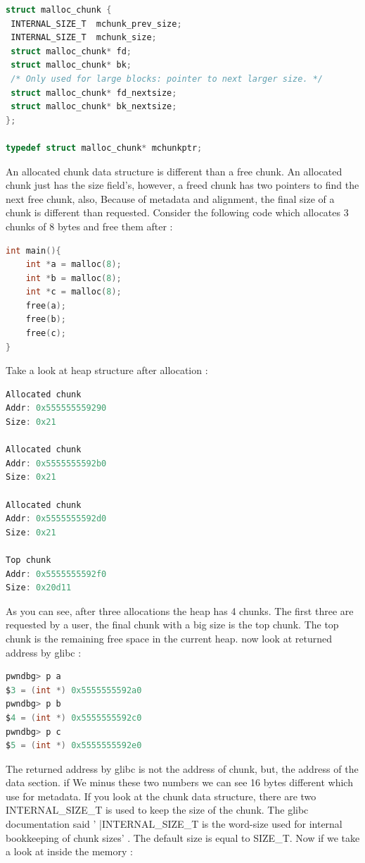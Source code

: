 \documentclass{masterthesis}
\newcommand*\sizet{SIZE\_T}
\newcommand*\libc{glibc}
\begin{document}
\begin{lstlisting}[language=c,frame=tlrb]
struct malloc_chunk {
 INTERNAL_SIZE_T  mchunk_prev_size; 
 INTERNAL_SIZE_T  mchunk_size;
 struct malloc_chunk* fd; 
 struct malloc_chunk* bk;
 /* Only used for large blocks: pointer to next larger size. */
 struct malloc_chunk* fd_nextsize;
 struct malloc_chunk* bk_nextsize;
};

typedef struct malloc_chunk* mchunkptr;
\end{lstlisting}

An allocated chunk data structure is different than a free chunk. An allocated chunk just has the size field's, however, a freed chunk has two pointers to find the next free chunk, also, Because of metadata and alignment, the final size of a chunk is different than requested. Consider the following code which allocates 3 chunks of 8 bytes and free them after :

\begin{lstlisting}[language=c,frame=tlrb]
int main(){
	int *a = malloc(8);
	int *b = malloc(8);
	int *c = malloc(8);
	free(a);
	free(b);
	free(c);
}
\end{lstlisting}

Take a look at heap structure after allocation : 

\begin{lstlisting}[language=c,frame=tlrb]
Allocated chunk
Addr: 0x555555559290
Size: 0x21

Allocated chunk
Addr: 0x5555555592b0
Size: 0x21

Allocated chunk
Addr: 0x5555555592d0
Size: 0x21

Top chunk 
Addr: 0x5555555592f0
Size: 0x20d11
\end{lstlisting}

As you can see, after three allocations the heap has 4 chunks. The first three are requested by a user, the final chunk with a big size is the top chunk. The top chunk is the remaining free space in the current heap. now look at returned address by \libc{} :

\begin{lstlisting}[language=c,frame=tlrb]
pwndbg> p a
$3 = (int *) 0x5555555592a0
pwndbg> p b
$4 = (int *) 0x5555555592c0
pwndbg> p c
$5 = (int *) 0x5555555592e0
\end{lstlisting}

The returned address by \libc{} is not the address of chunk, but, the address of the data section. if We minus these two numbers we can see 16 bytes different which use for metadata. If you look at the chunk data structure, there are two INTERNAL\_SIZE\_T is used to keep the size of the chunk. The \libc{} documentation said ' |INTERNAL\_SIZE\_T is the word-size used for internal bookkeeping of chunk sizes' . The default size is equal to \sizet{}. Now if we take a look at inside the memory : 
\end{document}

